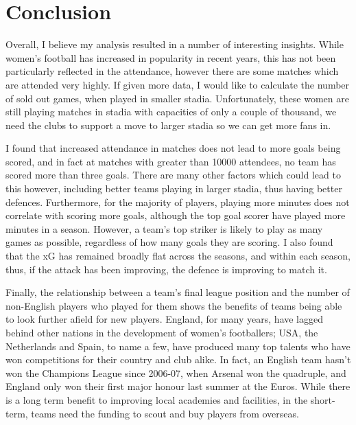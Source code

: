 \documentclass[12pt, a4paper, twocolumn]{article}
\begin{document}
\section{Conclusion}

Overall, I believe my analysis resulted in a number of interesting insights. While women's football has increased in popularity in recent years, this has not been particularly reflected in the attendance, however there are some matches which are attended very highly. If given more data, I would like to calculate the number of sold out games, when played in smaller stadia. Unfortunately, these women are still playing matches in stadia with capacities of only a couple of thousand, we need the clubs to support a move to larger stadia so we can get more fans in.

I found that increased attendance in matches does not lead to more goals being scored, and in fact at matches with greater than 10000 attendees, no team has scored more than three goals. There are many other factors which could lead to this however, including better teams playing in larger stadia, thus having better defences. Furthermore, for the majority of players, playing more minutes does not correlate with scoring more goals, although the top goal scorer have played more minutes in a season. However, a team's top striker is likely to play as many games as possible, regardless of how many goals they are scoring. I also found that the xG has remained broadly flat across the seasons, and within each season, thus, if the attack has been improving, the defence is improving to match it.

Finally, the relationship between a team's final league position and the number of non-English players who played for them shows the benefits of teams being able to look further afield for new players. England, for many years, have lagged behind other nations in the development of women's footballers; USA, the Netherlands and Spain, to name a few, have produced many top talents who have won competitions for their country and club alike. In fact, an English team hasn't won the Champions League since 2006-07, when Arsenal won the quadruple, and England only won their first major honour last summer at the Euros. While there is a long term benefit to improving local academies and facilities, in the short-term, teams need the funding to scout and buy players from overseas.

\end{document}
